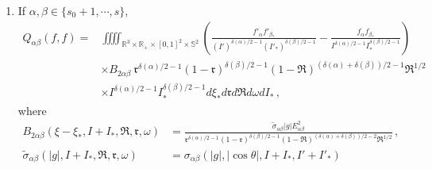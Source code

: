 \documentclass[reqno,11pt]{amsart}
\numberwithin{equation}{section}
\def\R{\mathbb{R}}
\begin{document}
\begin{enumerate}
\begin{equation}
\begin{aligned}
		  Q_{\alpha \beta} (f,f) = & \iiint_{\R^3  \times [0,1] \times \mathbb{S}^2} B_{1\beta \alpha }(\xi-\xi_*,I,\mathfrak{R},\omega ) (\tfrac{f'_\alpha f'_{\beta_*}}{(I')^{\delta(\alpha)/2-1} } - \tfrac{f_\alpha f_{\beta_*}}{I^{\delta(\alpha)/2-1}}) \\
		&\times (1-\mathfrak{R})^{\delta(\alpha  )/2-1} \mathfrak{R}^{1/2} I^{\delta(\alpha )/2-1} d\xi_* d\mathfrak{R}d\omega \,,
	\end{aligned}
    \end{equation}
    where 
    \begin{equation}\label{B1-ba}
        \begin{aligned}
            B_{1 \beta \alpha }(\xi-\xi_*,I,\mathfrak{R},\omega )  = \tfrac{\tilde{\sigma}_{\alpha \beta }|g|E_{\alpha \beta }}{\mathfrak{R}^{1/2} (1-\mathfrak{R})^{\delta(\alpha)/2-1}},\  \tilde{\sigma}_{\alpha \beta } (|g|,I ,\mathfrak{R},\omega )=\sigma_{\alpha \beta }(|g|,|\cos \theta|,I,I') \,;
        \end{aligned}
    \end{equation}
    \item If $ \alpha ,\beta \in \{s_0+ 1,\cdots, s \}$,
    \begin{equation}\label{eq2.17}
	\begin{aligned}
		Q_{\alpha \beta } (f,f) 
		=& \iiiint_{\R^3 \times \R_+ \times [0,1]^2 \times \mathbb{S}^2 } (\tfrac{f'_\alpha f'_{\beta_*}}{(I')^{\delta(\alpha)/2-1} (I'_* )^{\delta(\beta)/2-1}} - \tfrac{f_\alpha f_{\beta_*}}{I^{\delta(\alpha)/2-1} I_* ^{\delta(\beta)/2-1}})\\
		& \times B_{2 \alpha \beta } \ \mathfrak{r}^{\delta(\alpha)/2-1} (1-\mathfrak{r})^{\delta (\beta )/2-1 } (1-\mathfrak{R} ) ^{(\delta (\alpha) +\delta (\beta ))/2-1} \mathfrak{R}^{1/2} \\
		&\times I^{\delta(\alpha)/2-1 } I_*^{\delta (\beta )/2-1} d\xi_* d\mathfrak{r}d\mathfrak{R}d\omega dI_* \,,
        \end{aligned}
    \end{equation}
    where
    \begin{equation}\label{B2-ab}
        \begin{aligned}
            B_{2\alpha \beta }(\xi-\xi_*,I+I_*,\mathfrak{R},\mathfrak{r},\omega)&= \tfrac{\tilde{\sigma}_{\alpha \beta } |g|E^2_{\alpha \beta }}{\mathfrak{r}^{\delta(\alpha)/2-1} (1-\mathfrak{r})^{\delta (\beta )/2-1 }(1-\mathfrak{R} ) ^{(\delta (\alpha) +\delta (\beta ))/2-2} \mathfrak{R}^{1/2} } \,,\\
            \tilde{\sigma}_{\alpha \beta } (|g|,I+I_*,\mathfrak{R},\mathfrak{r},\omega) &= \sigma_{\alpha \beta } (|g|,|\cos \theta|,I+I_*,I'+I'_*) 
        \end{aligned}
    \end{equation}
\end{enumerate}
\end{document}
